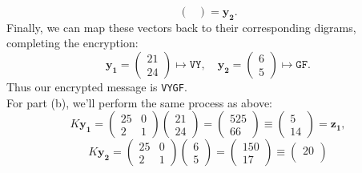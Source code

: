 \documentclass[12pt]{article}
\newenvironment{answer}
    {\begin{adjustwidth}{0pt}{0pt}}
    {\end{adjustwidth}}
\theoremstyle{remark}  %
\begin{document}
\begin{answer}
$$\begin{pmatrix}
            \end{pmatrix} = \mathbf{y_2}
            .$$ 
        Finally, we can map these vectors back to their corresponding digrams, completing the encryption: $$
            \mathbf{y_1} = \begin{pmatrix}
                21 \\
                24
            \end{pmatrix} \mapsto \texttt{VY},\quad\mathbf{y_2} = \begin{pmatrix}
                6 \\
                5
            \end{pmatrix} \mapsto \texttt{GF}.$$ Thus our encrypted message is \texttt{VYGF}. \vspace{11pt} \\  
        For part (b), we'll perform the same process as above:
        $$
            K\mathbf{y_1} = \begin{pmatrix}
                25 & 0 \\
                2 & 1
            \end{pmatrix}
            \begin{pmatrix}
                21 \\
                24
            \end{pmatrix} = 
            \begin{pmatrix}
                525 \\
                66
            \end{pmatrix} \equiv
            \begin{pmatrix}
                5 \\
                14
            \end{pmatrix} = \mathbf{z_1},$$$$ K\mathbf{y_2} = 
            \begin{pmatrix}
                25 & 0 \\
                2 & 1
            \end{pmatrix}
            \begin{pmatrix}
                6 \\
                5
            \end{pmatrix} = 
            \begin{pmatrix}
                150 \\
                17
            \end{pmatrix} \equiv
            \begin{pmatrix}
                20 \\

\end{pmatrix}$$
\end{answer}
\end{document}
